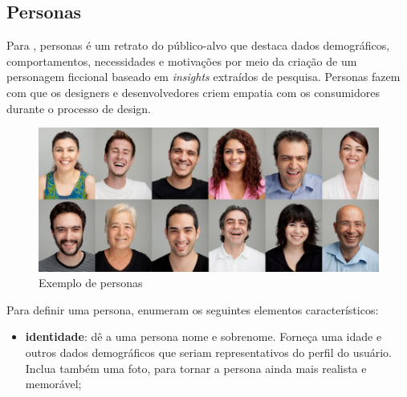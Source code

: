 \subsection{Personas}

Para , personas é  um retrato do público-alvo que destaca dados demográficos, comportamentos,
necessidades e motivações por meio da criação de um personagem ficcional
baseado em \textit{insights} extraídos de pesquisa. Personas fazem com que os designers e desenvolvedores criem empatia com os consumidores durante o processo de design.

\begin{figure}[H]
	\centering
	\includegraphics[scale=0.4]{imagens/personas-marketing.png}
	\caption{Exemplo de personas}
\end{figure}

Para definir uma persona,  enumeram os seguintes elementos
característicos:

\begin{itemize}
	\item \textbf{identidade}: dê a uma persona nome e sobrenome. Forneça uma idade e outros dados demográficos que seriam representativos do perfil do usuário. Inclua também uma foto, para tornar a persona ainda mais realista e memorável;
\end{itemize}




